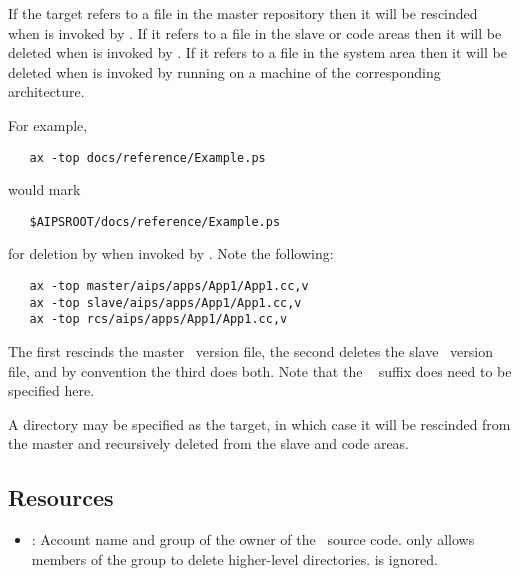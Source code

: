 \begin{description}
   If the target refers to a file in the master repository then it will be
   rescinded when  is invoked by .  If it refers to a
   file in the slave or code areas then it will be deleted when
    is invoked by .  If it refers to a file in
   the system area then it will be deleted when  is invoked by
    running on a machine of the corresponding architecture.

   For example,

\begin{verbatim}
   ax -top docs/reference/Example.ps
\end{verbatim}

   \noindent
   would mark

\begin{verbatim}
   $AIPSROOT/docs/reference/Example.ps
\end{verbatim}

   \noindent
   for deletion by  when invoked by .  Note the
   following:

\begin{verbatim}
   ax -top master/aips/apps/App1/App1.cc,v
   ax -top slave/aips/apps/App1/App1.cc,v
   ax -top rcs/aips/apps/App1/App1.cc,v
\end{verbatim}

   \noindent
   The first rescinds the master \rcs\ version file, the second deletes the
   slave \rcs\ version file, and by convention the third does both.  Note
   that the \rcs\  suffix does need to be specified here.

   \noindent
   A directory may be specified as the target, in which case it will be
   rescinded from the master and recursively deleted from the slave and code
   areas.
\end{description}

\subsection*{Resources}

\begin{itemize}
\item
   : Account name and group of the owner of the
   \aipspp\ source code.   only allows members of the 
   group to delete higher-level directories.   is
   ignored.
\end{itemize}

